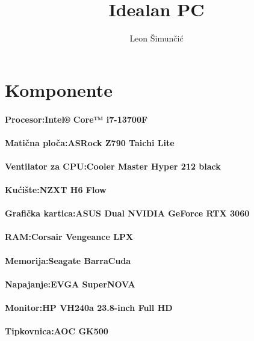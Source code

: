 \documentclass{article}
\title{Idealan PC}
\author{Leon Šimunčić}
\begin{document}
\maketitle
\section{\huge{Komponente}}
\paragraph{\large{Procesor:Intel® Core™ i7-13700F}}



\paragraph{\large{Matična ploča:ASRock Z790 Taichi Lite}}
\paragraph{\large{Ventilator za CPU:Cooler Master Hyper 212 black}}
\paragraph{\large{Kućište:NZXT H6 Flow}}
\paragraph{\large{Grafička kartica:ASUS Dual NVIDIA GeForce RTX 3060}}
\paragraph{\large{RAM:Corsair Vengeance LPX}}
\paragraph{\large{Memorija:Seagate BarraCuda}}

\paragraph{\large{Napajanje:EVGA SuperNOVA}}
\paragraph{\large{Monitor:HP VH240a 23.8-inch Full HD}}
\paragraph{\large{Tipkovnica:AOC GK500}}
\end{document}
